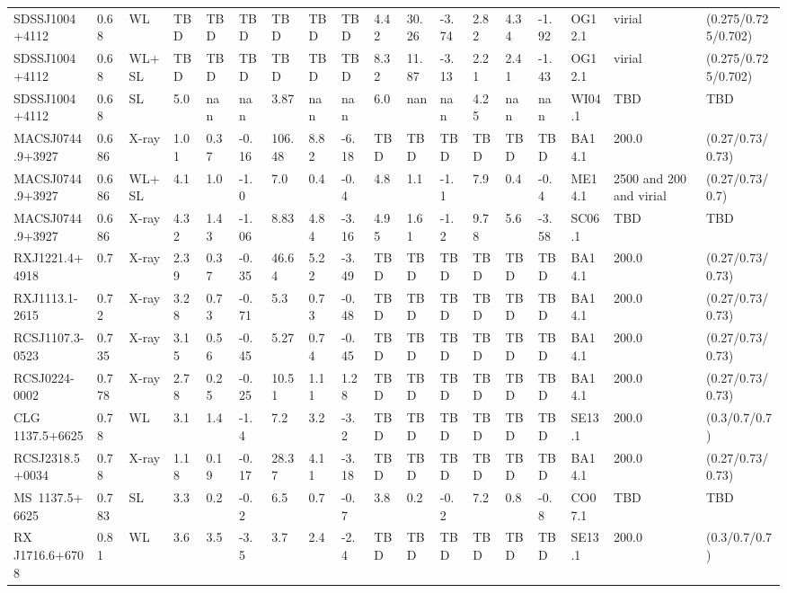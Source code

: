 \documentclass{article}
\begin{document}
\begin{center}
\begin{landscape}
\begin{longtable}{llllllllllllllllll}
SDSSJ1004+4112 & 0.68 & WL & TBD & TBD & TBD & TBD & TBD & TBD & 4.42 & 30.26 & -3.74 & 2.82 & 4.34 & -1.92 & OG12.1 & virial & (0.275/0.725/0.702) \\
SDSSJ1004+4112 & 0.68 & WL+SL & TBD & TBD & TBD & TBD & TBD & TBD & 8.32 & 11.87 & -3.13 & 2.21 & 2.41 & -1.43 & OG12.1 & virial & (0.275/0.725/0.702) \\
SDSSJ1004+4112 & 0.68 & SL & 5.0 & nan & nan & 3.87 & nan & nan & 6.0 & nan & nan & 4.25 & nan & nan & WI04.1 & TBD & TBD \\
MACSJ0744.9+3927 & 0.686 & X-ray & 1.01 & 0.37 & -0.16 & 106.48 & 8.82 & -6.18 & TBD & TBD & TBD & TBD & TBD & TBD & BA14.1 & 200.0 & (0.27/0.73/0.73) \\
MACSJ0744.9+3927 & 0.686 & WL+SL & 4.1 & 1.0 & -1.0 & 7.0 & 0.4 & -0.4 & 4.8 & 1.1 & -1.1 & 7.9 & 0.4 & -0.4 & ME14.1 & 2500 and 200 and virial & (0.27/0.73/0.7) \\
MACSJ0744.9+3927 & 0.686 & X-ray & 4.32 & 1.43 & -1.06 & 8.83 & 4.84 & -3.16 & 4.95 & 1.61 & -1.2 & 9.78 & 5.6 & -3.58 & SC06.1 & TBD & TBD \\
RXJ1221.4+4918 & 0.7 & X-ray & 2.39 & 0.37 & -0.35 & 46.64 & 5.22 & -3.49 & TBD & TBD & TBD & TBD & TBD & TBD & BA14.1 & 200.0 & (0.27/0.73/0.73) \\
RXJ1113.1-2615 & 0.72 & X-ray & 3.28 & 0.73 & -0.71 & 5.3 & 0.73 & -0.48 & TBD & TBD & TBD & TBD & TBD & TBD & BA14.1 & 200.0 & (0.27/0.73/0.73) \\
RCSJ1107.3-0523 & 0.735 & X-ray & 3.15 & 0.56 & -0.45 & 5.27 & 0.74 & -0.45 & TBD & TBD & TBD & TBD & TBD & TBD & BA14.1 & 200.0 & (0.27/0.73/0.73) \\
RCSJ0224-0002 & 0.778 & X-ray & 2.78 & 0.25 & -0.25 & 10.51 & 1.11 & 1.28 & TBD & TBD & TBD & TBD & TBD & TBD & BA14.1 & 200.0 & (0.27/0.73/0.73) \\
CLG 1137.5+6625 & 0.78 & WL & 3.1 & 1.4 & -1.4 & 7.2 & 3.2 & -3.2 & TBD & TBD & TBD & TBD & TBD & TBD & SE13.1 & 200.0 & (0.3/0.7/0.7) \\
RCSJ2318.5+0034 & 0.78 & X-ray & 1.18 & 0.19 & -0.17 & 28.37 & 4.11 & -3.18 & TBD & TBD & TBD & TBD & TBD & TBD & BA14.1 & 200.0 & (0.27/0.73/0.73) \\
MS~1137.5+6625 & 0.783 & SL & 3.3 & 0.2 & -0.2 & 6.5 & 0.7 & -0.7 & 3.8 & 0.2 & -0.2 & 7.2 & 0.8 & -0.8 & CO07.1 & TBD & TBD \\
RX J1716.6+6708 & 0.81 & WL & 3.6 & 3.5 & -3.5 & 3.7 & 2.4 & -2.4 & TBD & TBD & TBD & TBD & TBD & TBD & SE13.1 & 200.0 & (0.3/0.7/0.7) \\

\end{longtable}
\end{landscape}
\end{center}
\end{document}

